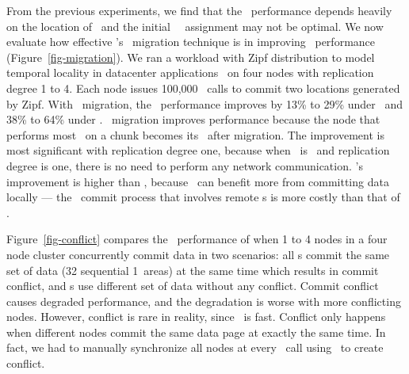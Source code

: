 From the previous experiments, we find that the \commitxact\ performance depends heavily on the location of \on\
and the initial \hotpot\ \on\ assignment may not be optimal.
We now evaluate how effective \hotpot's \on\ migration technique is in improving \commitxact\ performance (Figure~\ref{fig-migration}). 
We ran a workload with Zipf distribution to model temporal locality in datacenter applications~\cite{Atikoglu12,Breslau99} on four nodes with replication degree 1 to 4.
Each node issues 100,000 \commitxact\ calls to commit two locations generated by Zipf.
With \on\ migration, the \commitxact\ performance improves by 13\% to 29\% under \mrsw\ and 38\% to 64\% under \mrmw.
\on\ migration improves performance because the node that performs most \commitxact\ on a chunk becomes its \on\ after migration.
The improvement is most significant with replication degree one, 
because when \xn\ is \on\ and replication degree is one, there is no need to perform any network communication.
\mrmw's improvement is higher than \mrsw, because \mrmw\ can benefit more from committing data locally
--- the \mrmw\ commit process that involves remote \on{}s is more costly than that of \mrsw.

Figure~\ref{fig-conflict} compares the \commitxact\ performance of when 1 to 4 nodes in a four node cluster 
concurrently commit data in two scenarios:
all \xn{}s commit the same set of data (32 sequential 1\KB\ areas) at the same time which results in commit conflict,
and \xn{}s use different set of data without any conflict.
Commit conflict causes degraded performance, 
and the degradation is worse with more conflicting nodes.
However, conflict is rare in reality, since \commitxact\ is fast.
Conflict only happens when different nodes commit the same data page at exactly the same time.
In fact, we had to manually synchronize all nodes at every \commitxact\ call using \barrier\ to create conflict.
